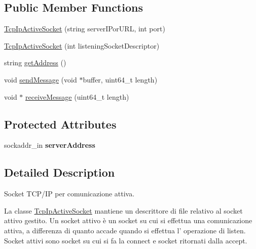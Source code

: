 \subsection*{Public Member Functions}
\begin{DoxyCompactItemize}
\item 
\hyperlink{class_tcp_ip_active_socket_ab9cc81d079fc72277df1b9e898a13fd6}{TcpIpActiveSocket} (string serverIPorURL, int port)
\item 
\hyperlink{class_tcp_ip_active_socket_a8ff972c78aa7000ef57fac5347e5d7da}{TcpIpActiveSocket} (int listeningSocketDescriptor)
\item 
string \hyperlink{class_tcp_ip_active_socket_aef67199e2016b6c0d39c7c4a0b7ea639}{getAddress} ()
\item 
void \hyperlink{class_tcp_ip_active_socket_a498afb4575c1beb4d7de9b2297c03f30}{sendMessage} (void $\ast$buffer, uint64\_\-t length)
\item 
void $\ast$ \hyperlink{class_tcp_ip_active_socket_aff67cf14e0d23412ea0dcc50f063bb64}{receiveMessage} (uint64\_\-t length)
\end{DoxyCompactItemize}
\subsection*{Protected Attributes}
\begin{DoxyCompactItemize}
\item 
\hypertarget{class_tcp_ip_active_socket_aaf0d1bc2f0bc9e4552f773fe146c4b4d}{
sockaddr\_\-in {\bfseries serverAddress}}
\label{class_tcp_ip_active_socket_aaf0d1bc2f0bc9e4552f773fe146c4b4d}

\end{DoxyCompactItemize}


\subsection{Detailed Description}
Socket TCP/IP per comunicazione attiva. 

La classe \hyperlink{class_tcp_ip_active_socket}{TcpIpActiveSocket} mantiene un descrittore di file relativo al socket attivo gestito. Un socket attivo è un socket su cui si effettua una comunicazione attiva, a differenza di quanto accade quando si effettua l' operazione di listen. Socket attivi sono socket su cui si fa la connect e socket ritornati dalla accept. 

